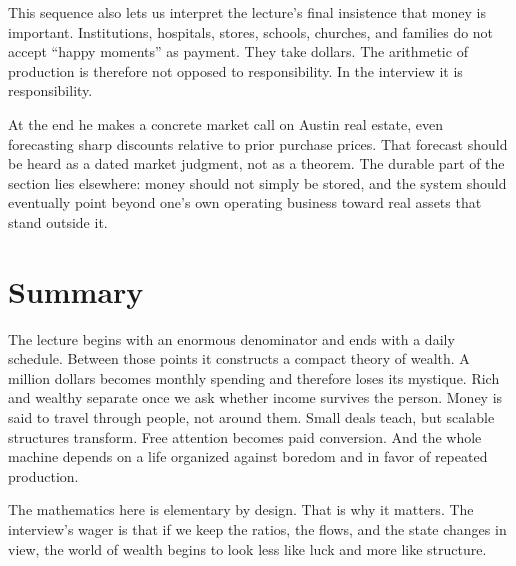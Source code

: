 This sequence also lets us interpret the lecture's final insistence that money is important. Institutions, hospitals, stores, schools, churches, and families do not accept ``happy moments'' as payment. They take dollars. The arithmetic of production is therefore not opposed to responsibility. In the interview it is responsibility.

At the end he makes a concrete market call on Austin real estate, even forecasting sharp discounts relative to prior purchase prices. That forecast should be heard as a dated market judgment, not as a theorem. The durable part of the section lies elsewhere: money should not simply be stored, and the system should eventually point beyond one's own operating business toward real assets that stand outside it.

\section{Summary}

The lecture begins with an enormous denominator and ends with a daily schedule. Between those points it constructs a compact theory of wealth. A million dollars becomes monthly spending and therefore loses its mystique. Rich and wealthy separate once we ask whether income survives the person. Money is said to travel through people, not around them. Small deals teach, but scalable structures transform. Free attention becomes paid conversion. And the whole machine depends on a life organized against boredom and in favor of repeated production.

The mathematics here is elementary by design. That is why it matters. The interview's wager is that if we keep the ratios, the flows, and the state changes in view, the world of wealth begins to look less like luck and more like structure.